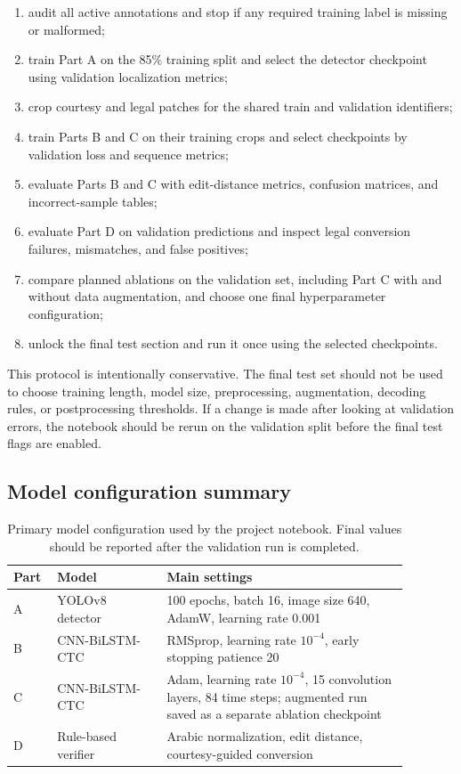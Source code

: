 \documentclass{article}
\begin{document}
\begin{enumerate}
  \item audit all active annotations and stop if any required training label is missing or malformed;
  \item train Part A on the 85\% training split and select the detector checkpoint using validation localization metrics;
  \item crop courtesy and legal patches for the shared train and validation identifiers;
  \item train Parts B and C on their training crops and select checkpoints by validation loss and sequence metrics;
  \item evaluate Parts B and C with edit-distance metrics, confusion matrices, and incorrect-sample tables;
  \item evaluate Part D on validation predictions and inspect legal conversion failures, mismatches, and false positives;
  \item compare planned ablations on the validation set, including Part C with and without data augmentation, and choose one final hyperparameter configuration;
  \item unlock the final test section and run it once using the selected checkpoints.
\end{enumerate}

This protocol is intentionally conservative. The final test set should not be used to choose training length, model size, preprocessing, augmentation, decoding rules, or postprocessing thresholds. If a change is made after looking at validation errors, the notebook should be rerun on the validation split before the final test flags are enabled.

\subsection{Model configuration summary}

\begin{table}[h]
  \centering
  \caption{Primary model configuration used by the project notebook. Final values should be reported after the validation run is completed.}
  \label{tab:configuration}
  \small
  \begin{tabular}{p{0.08\linewidth}p{0.25\linewidth}p{0.55\linewidth}}
    \toprule
    Part & Model & Main settings \\
    \midrule
    A & YOLOv8 detector & 100 epochs, batch 16, image size 640, AdamW, learning rate 0.001 \\
    B & CNN-BiLSTM-CTC & RMSprop, learning rate \(10^{-4}\), early stopping patience 20 \\
    C & CNN-BiLSTM-CTC & Adam, learning rate \(10^{-4}\), 15 convolution layers, 84 time steps; augmented run saved as a separate ablation checkpoint \\
    D & Rule-based verifier & Arabic normalization, edit distance, courtesy-guided conversion \\
    \bottomrule
  \end{tabular}
\end{table}
\end{document}
